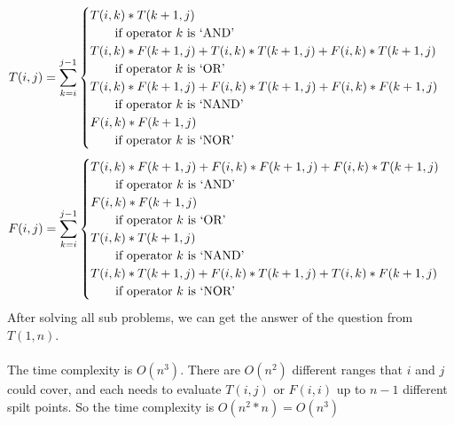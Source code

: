 \documentclass[12pt]{article}
\begin{document}
 \[ T(i, j) = \sum_{k = i}^{j-1}  \begin{cases} 
       T(i, k)*T(k+1, j) & \\ \mbox{\qquad if operator $k$ is `AND' }\\
       T(i, k) * F(k + 1, j) + T(i, k) * T(k + 1, j) + F(i, k) * T(k + 1, j) & \\ 
       \mbox{\qquad if operator $k$ is `OR' }\\
       T(i, k) * F(k + 1, j) + F(i, k) * T(k + 1, j) + F(i, k) * F(k + 1, j) & \\ 
       \mbox{\qquad if operator $k$ is `NAND' }\\
       F(i, k) * F(k + 1, j) & \\ 
       \mbox{\qquad if operator $k$ is `NOR' }
    \end{cases}
 \]
 \[ F(i, j) = \sum_{k = i}^{j-1}  \begin{cases} 
       T(i, k) * F(k + 1, j) + F(i, k) * F(k + 1, j) + F(i, k) * T(k + 1, j) & \\ \mbox{\qquad if operator $k$ is `AND' }\\
       F(i, k) * F(k + 1, j) & \\ 
       \mbox{\qquad if operator $k$ is `OR' }\\
       T(i, k) * T(k + 1, j) & \\ 
       \mbox{\qquad if operator $k$ is `NAND' }\\
       T(i, k) * T(k + 1, j) + F(i, k) * T(k + 1, j) + T(i, k) * F(k + 1, j) & \\ 
       \mbox{\qquad if operator $k$ is `NOR' }
    \end{cases}
 \]
 After solving all sub problems, we can get the answer of the question from 
 $T(1,n)$.\\\\
 The time complexity is $O(n^3)$. There are $O(n^2)$ different ranges
 that $i$ and $j$ could cover, and each needs to evaluate
 $T(i, j)$ or $F(i, i)$ up to $n - 1$ different spilt points.
 So the time complexity is $O(n^2*n) = O(n^3)$
\end{document}
